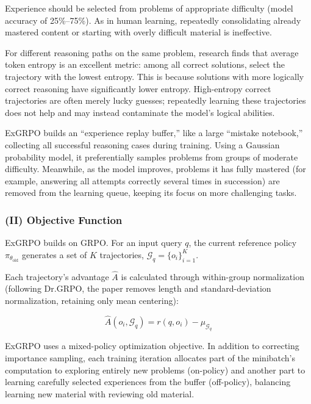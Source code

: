 Experience should be selected from problems of appropriate difficulty (model accuracy of 25\%--75\%). As in human learning, repeatedly consolidating already mastered content or starting with overly difficult material is ineffective.

For different reasoning paths on the same problem, research finds that average token entropy is an excellent metric: among all correct solutions, select the trajectory with the lowest entropy. This is because solutions with more logically correct reasoning have significantly lower entropy. High-entropy correct trajectories are often merely lucky guesses; repeatedly learning these trajectories does not help and may instead contaminate the model's logical abilities.

ExGRPO builds an ``experience replay buffer,'' like a large ``mistake notebook,'' collecting all successful reasoning cases during training. Using a Gaussian probability model, it preferentially samples problems from groups of moderate difficulty. Meanwhile, as the model improves, problems it has fully mastered (for example, answering all attempts correctly several times in succession) are removed from the learning queue, keeping its focus on more challenging tasks.

\hypertarget{ii-objective-function-1}{%
\subsubsection{(II) Objective Function}\label{ii-objective-function-1}}

ExGRPO builds on GRPO. For an input query \(q\), the current reference policy \(\pi_{\theta_{\mathrm{old}}}\) generates a set of \(K\) trajectories, \(\mathcal{G}_q=\{o_i\}_{i=1}^{K}\).

Each trajectory's advantage \(\hat{A}\) is calculated through within-group normalization (following Dr.GRPO, the paper removes length and standard-deviation normalization, retaining only mean centering):

\[
\hat{A}(o_i,\mathcal{G}_q)=r(q,o_i)-\mu_{\mathcal{G}_q}
\]

ExGRPO uses a mixed-policy optimization objective. In addition to correcting importance sampling, each training iteration allocates part of the minibatch's computation to exploring entirely new problems (on-policy) and another part to learning carefully selected experiences from the buffer (off-policy), balancing learning new material with reviewing old material.

